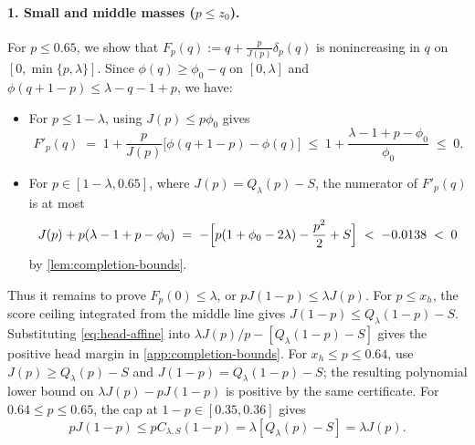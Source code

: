 \documentclass[11pt]{article}
\numberwithin{equation}{section}
\theoremstyle{plain}
\theoremstyle{definition}
\newcommand{\1}{\mathbf{1}}
\begin{document}
\paragraph{1. Small and middle masses ($p \le z_0$).}
For $p \le 0.65$, we show that $F_p(q) := q + \frac{p}{J(p)}\delta_p(q)$ is nonincreasing in $q$ on $[0, \min\{p, \lambda\}]$. Since $\phi(q) \ge \phi_0 - q$ on $[0, \lambda]$ and $\phi(q + 1 - p) \le \lambda - q - 1 + p$, we have:
\begin{itemize}
  \item For $p \le 1 - \lambda$, using $J(p) \le p\phi_0$ gives
  \[
    F'_p(q) \;=\; 1 + \frac{p}{J(p)}\bigl[\phi(q + 1 - p) - \phi(q)\bigr] \;\le\; 1 + \frac{\lambda - 1 + p - \phi_0}{\phi_0} \;\le\; 0.
  \]
  \item For $p \in [1 - \lambda, 0.65]$, where $J(p) = Q_\lambda(p) - S$, the numerator of $F'_p(q)$ is at most
  \[
    J(p) + p(\lambda - 1 + p - \phi_0) \;=\; -\Bigl[p(1 + \phi_0 - 2\lambda) - \frac{p^2}{2} + S\Bigr] \;<\; -0.0138 \;<\; 0
  \]
  by \cref{lem:completion-bounds}.
\end{itemize}
Thus it remains to prove $F_p(0)\le\lambda$, or $pJ(1-p)\le\lambda J(p)$. For $p\le x_h$, the score ceiling integrated from the middle line gives $J(1-p)\le Q_\lambda(1-p)-S$. Substituting \cref{eq:head-affine} into $\lambda J(p)/p-[Q_\lambda(1-p)-S]$ gives the positive head margin in \cref{app:completion-bounds}. For $x_h\le p\le0.64$, use $J(p)\ge Q_\lambda(p)-S$ and $J(1-p)=Q_\lambda(1-p)-S$; the resulting polynomial lower bound on $\lambda J(p)-pJ(1-p)$ is positive by the same certificate. For $0.64\le p\le0.65$, the cap at $1-p\in[0.35,0.36]$ gives
\[
 pJ(1-p)\le pC_{\lambda,S}(1-p)=\lambda[Q_\lambda(p)-S]=\lambda J(p).
\]
\end{document}

